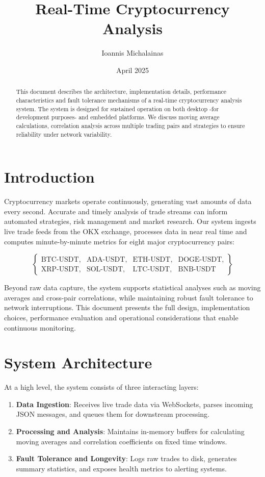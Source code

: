 \documentclass{article}
\title{Real-Time Cryptocurrency Analysis}
\author{Ioannis Michalainas}
\date{April 2025}
\begin{document}
\maketitle

\begin{abstract}
This document describes the architecture, implementation details, performance characteristics and fault tolerance mechanisms of a real-time cryptocurrency analysis system. The system is designed for sustained operation on both desktop -for development purposes- and embedded platforms. We discuss moving average calculations, correlation analysis across multiple trading pairs and strategies to ensure reliability under network variability.
\end{abstract}

\tableofcontents

\section{Introduction}
Cryptocurrency markets operate continuously, generating vast amounts of data every second. Accurate and timely analysis of trade streams can inform automated strategies, risk management and market research. Our system ingests live trade feeds from the OKX exchange, processes data in near real time and computes minute-by-minute metrics for eight major cryptocurrency pairs:

\[
\left\{
\begin{array}{cccc}
\text{BTC-USDT}, & \text{ADA-USDT}, & \text{ETH-USDT}, & \text{DOGE-USDT}, \\
\text{XRP-USDT}, & \text{SOL-USDT}, & \text{LTC-USDT}, & \text{BNB-USDT}
\end{array}
\right\}
\]

Beyond raw data capture, the system supports statistical analyses such as moving averages and cross-pair correlations, while maintaining robust fault tolerance to network interruptions. This document presents the full design, implementation choices, performance evaluation and operational considerations that enable continuous monitoring.


\section{System Architecture}
At a high level, the system consists of three interacting layers:
\begin{enumerate}
  \item \textbf{Data Ingestion}: Receives live trade data via WebSockets, parses incoming JSON messages, and queues them for downstream processing.
  \item \textbf{Processing and Analysis}: Maintains in-memory buffers for calculating moving averages and correlation coefficients on fixed time windows.
  \item \textbf{Fault Tolerance and Longevity}: Logs raw trades to disk, generates summary statistics, and exposes health metrics to alerting systems.
\end{enumerate}
\end{document}
